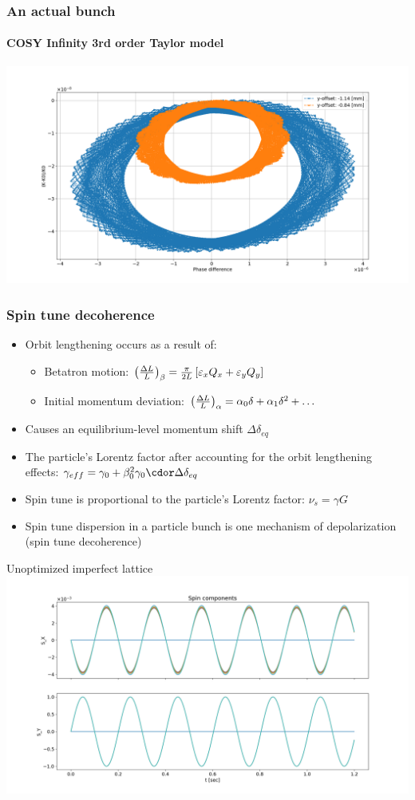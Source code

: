 \documentclass{beamer}
\begin{document}
\begin{frame}\frametitle{An actual bunch} \framesubtitle{COSY Infinity 3rd order Taylor model}
  \centering
  \includegraphics[width=\linewidth]{psp_diagram_betatron}
\end{frame}

\begin{frame}\frametitle{Spin tune decoherence}
  \begin{itemize}
  \item Orbit lengthening occurs as a result of:
    \begin{itemize}
    \item Betatron motion: $\bkt{\frac{\Delta L}{L}}_\beta = \frac{\pi}{2L}\bkt*{\varepsilon_xQ_x + \varepsilon_yQ_y}$
    \item Initial momentum deviation: $\bkt{\frac{\Delta L}{L}}_\alpha = \alpha_0\delta + \alpha_1\delta^2 + \dots$
    \end{itemize}
  \item Causes an equilibrium-level momentum shift $\Delta\delta_{eq}$
  \item The particle's Lorentz factor after accounting for the orbit lengthening effects: $\gamma_{eff} = \gamma_0 + \beta_0^2\gamma_0\cdor \Delta\delta_{eq}$
  \item Spin tune is proportional to the particle's Lorentz factor: $\nu_s = \gamma G$
  \item Spin tune dispersion in a particle bunch is one mechanism of depolarization (spin tune decoherence)
  \end{itemize}
\end{frame}

\begin{frame}{Unoptimized imperfect lattice}
  \centering
  \includegraphics[width=\linewidth, trim=85 25 120 55, clip]{SXSY_10pcls_1sec}
\end{frame}
\end{document}
